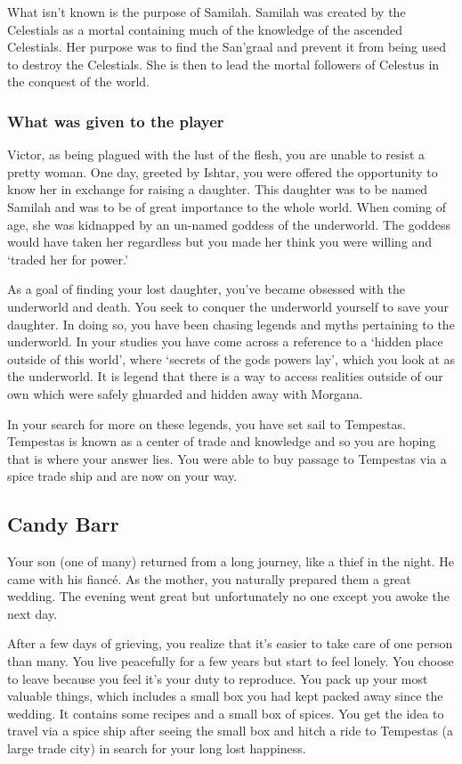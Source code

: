 What isn't known is the purpose of Samilah. Samilah was created by the Celestials as a mortal containing much of the knowledge of the ascended Celestials. Her purpose was to find the San'graal and prevent it from being used to destroy the Celestials. She is then to lead the mortal followers of Celestus in the conquest of the world. 

\subsubsection{What was given to the player}

Victor, as being plagued with the lust of the flesh, you are unable to resist a pretty woman. One day, greeted by Ishtar, you were offered the opportunity to know her in exchange for raising a daughter. This daughter was to be named Samilah and was to be of great importance to the whole world. When coming of age, she was kidnapped by an un-named goddess of the underworld. The goddess would have taken her regardless but you made her think you were willing and `traded her for power.'

As a goal of finding your lost daughter, you've became obsessed with the underworld and death. You seek to conquer the underworld yourself to save your daughter. In doing so, you have been chasing legends and myths pertaining to the underworld. In your studies you have come across a reference to a `hidden place outside of this world', where `secrets of the gods powers lay', which you look at as the underworld. It is legend that there is a way to access realities outside of our own which were safely ghuarded and hidden away with Morgana.

In your search for more on these legends, you have set sail to Tempestas. Tempestas is known as a center of trade and knowledge and so you are hoping that is where your answer lies. You were able to buy passage to Tempestas via a spice trade ship and are now on your way.

\subsection{Candy Barr}

Your son (one of many) returned from a long journey, like a thief in the night. He came with his fianc\'{e}. As the mother, you naturally prepared them a great wedding. The evening went great but unfortunately no one except you awoke the next day.

After a few days of grieving, you realize that it's easier to take care of one person than many. You live peacefully for a few years but start to feel lonely. You choose to leave because you feel it's your duty to reproduce. You pack up your most valuable things, which includes a small box you had kept packed away since the wedding. It contains some recipes and a small box of spices. You get the idea to travel via a spice ship after seeing the small box and hitch a ride to Tempestas (a large trade city) in search for your long lost happiness. 

